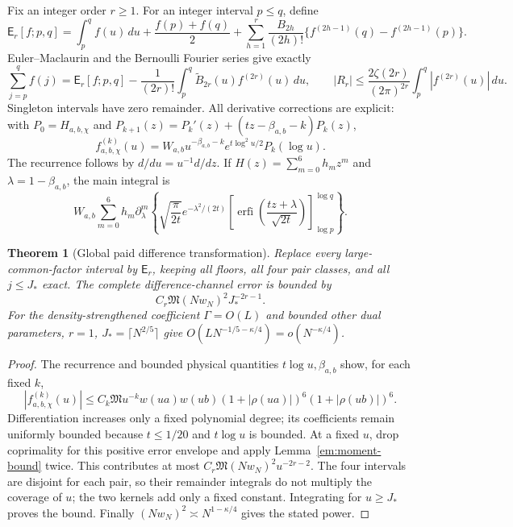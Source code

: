 \documentclass[11pt]{article}
\numberwithin{equation}{section}
\newtheorem{theorem}{Theorem}[section]
\theoremstyle{definition}
\theoremstyle{remark}
\DeclareMathOperator{\erfi}{erfi}
\newcommand{\dd}{\,d}
\begin{document}
Fix an integer order $r\ge1$. For an integer interval $p\le q$, define
\[
\mathsf E_r[f;p,q]=\int_p^q f(u)\dd u+\frac{f(p)+f(q)}2
 +\sum_{h=1}^r\frac{B_{2h}}{(2h)!}
                      \{f^{(2h-1)}(q)-f^{(2h-1)}(p)\}.
\]
Euler--Maclaurin and the Bernoulli Fourier series \cite{dlmfem,dlmfbern}
give exactly
\begin{equation}
 \sum_{j=p}^q f(j)=\mathsf E_r[f;p,q]
 -\frac1{(2r)!}\int_p^q\widetilde B_{2r}(u)f^{(2r)}(u)\dd u,
 \qquad
 |R_r|\le\frac{2\zeta(2r)}{(2\pi)^{2r}}\int_p^q|f^{(2r)}(u)|\dd u .
 \label{em:formula}
\end{equation}
Singleton intervals have zero remainder. All derivative corrections are
explicit: with $P_0=H_{a,b,\chi}$ and
$P_{k+1}(z)=P_k'(z)+(tz-\beta_{a,b}-k)P_k(z)$,
\[
f_{a,b,\chi}^{(k)}(u)=
W_{a,b}u^{-\beta_{a,b}-k}e^{t\log^2u/2}P_k(\log u).
\]
The recurrence follows by $d/du=u^{-1}d/dz$.
If $H(z)=\sum_{m=0}^6h_mz^m$ and $\lambda=1-\beta_{a,b}$,
the main integral is
\[
W_{a,b}\sum_{m=0}^6h_m\partial_\lambda^m
\left\{\sqrt{\frac\pi{2t}}e^{-\lambda^2/(2t)}
\left[\erfi\left(\frac{tz+\lambda}{\sqrt{2t}}\right)\right]
                          _{\log p}^{\log q}\right\}.
\]

\begin{theorem}[Global paid difference transformation]
\label{em:remainder}
Replace every large-common-factor interval by $\mathsf E_r$, keeping
all floors, all four pair classes, and all $j\le J_*$ exact.
The complete difference-channel error is bounded by
\[
 C_r\mathfrak M(Nw_N)^2J_*^{-2r-1}.
\]
For the density-strengthened coefficient $\Gamma=O(L)$ and bounded
other dual parameters, $r=1$, $J_*=\lceil N^{2/5}\rceil$ give
$O(LN^{-1/5-\kappa/4})=o(N^{-\kappa/4})$.
\end{theorem}
\begin{proof}
The recurrence and bounded physical quantities $t\log u,\beta_{a,b}$
show, for each fixed $k$,
\[
|f_{a,b,\chi}^{(k)}(u)|\le C_k\mathfrak M u^{-k}w(ua)w(ub)
(1+|\rho(ua)|)^6(1+|\rho(ub)|)^6 .
\]
Differentiation increases only a fixed polynomial degree; its coefficients
remain uniformly bounded because $t\le1/20$ and $t\log u$ is bounded.
At a fixed $u$, drop coprimality for this positive error envelope and apply
Lemma~\ref{em:moment-bound} twice. This contributes at most
$C_r\mathfrak M (Nw_N)^2u^{-2r-2}$.
The four intervals are disjoint for each pair, so their remainder
integrals do not multiply the coverage of $u$; the two kernels add
only a fixed constant. Integrating for $u\ge J_*$ proves the bound.
Finally $(Nw_N)^2\asymp N^{1-\kappa/4}$ gives the stated power.
\end{proof}
\end{document}

